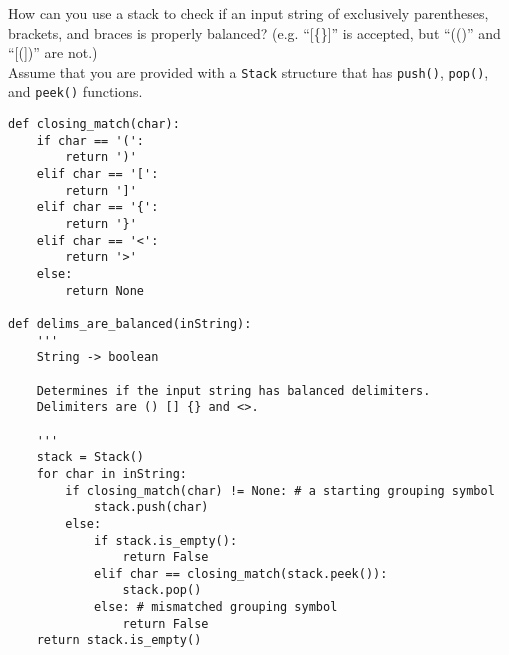 How can you use a stack to check if an input string
of exclusively parentheses, brackets, and braces is properly balanced?
(e.g. ``[\{\}]'' is accepted, but ``(()'' and ``[(])'' are not.)\\
Assume that you are provided with a \texttt{Stack} structure that has \texttt{push()}, \texttt{pop()}, and \texttt{peek()} functions.

\begin{answer}
\begin{lstlisting}
def closing_match(char):
	if char == '(':
		return ')'
	elif char == '[':
		return ']'
	elif char == '{':
		return '}'
	elif char == '<':
		return '>'
	else:
		return None

def delims_are_balanced(inString):
    '''
    String -> boolean
    
    Determines if the input string has balanced delimiters.
    Delimiters are () [] {} and <>.
    
    '''
    stack = Stack()
    for char in inString:
        if closing_match(char) != None: # a starting grouping symbol
            stack.push(char)
		else:
			if stack.is_empty():
				return False
			elif char == closing_match(stack.peek()):
				stack.pop()
			else: # mismatched grouping symbol
				return False
    return stack.is_empty()
\end{lstlisting}
\end{answer}

